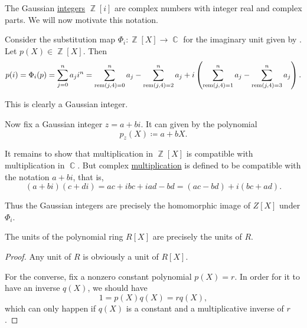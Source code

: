 \begin{example}\label{ex:polynomial_evaluation_gaussian_integers}
  The Gaussian \hyperref[def:gaussian_integers]{integers} \( \BbbZ[i] \) are complex numbers with integer real and complex parts. We will now motivate this notation.

  Consider the substitution map \( \Phi_i: \BbbZ[X] \to \BbbC \) for the imaginary unit given by . Let \( p(X) \in \BbbZ[X] \). Then
  \begin{equation*}
    p(i)
    =
    \Phi_i(p)
    =
    \sum_{j=0}^n a_j i^n
    =
    \sum_{\operatorname{rem}(j, 4) = 0}^n a_j - \sum_{\operatorname{rem}(j, 4) = 2}^n a_j + i \left(\sum_{\operatorname{rem}(j, 4) = 1}^n a_j - \sum_{\operatorname{rem}(j, 4) = 3}^n a_j \right).
  \end{equation*}

  This is clearly a Gaussian integer.

  Now fix a Gaussian integer \( z = a + bi \). It can given by the polynomial
  \begin{equation*}
    p_z(X) \coloneqq a + bX.
  \end{equation*}

  It remains to show that multiplication in \( \BbbZ[X] \) is compatible with multiplication in \( \BbbC \). But complex \hyperref[def:complex_numbers]{multiplication} is defined to be compatible with the notation \( a + bi \), that is,
  \begin{equation*}
    (a + bi) (c + di)
    =
    ac + ibc + iad - bd
    =
    (ac - bd) + i(bc + ad).
  \end{equation*}

  Thus the Gaussian integers are precisely the homomorphic image of \( Z[X] \) under \( \Phi_i \).
\end{example}

\begin{proposition}\label{thm:polynomial_ring_units}
  The units of the polynomial ring \( R[X] \) are precisely the units of \( R \).
\end{proposition}
\begin{proof}
  Any unit of \( R \) is obviously a unit of \( R[X] \).

  For the converse, fix a nonzero constant polynomial \( p(X) = r \). In order for it to have an inverse \( q(X) \), we should have
  \begin{equation*}
    1 = p(X) q(X) = r q(X),
  \end{equation*}
  which can only happen if \( q(X) \) is a constant and a multiplicative inverse of \( r \).
\end{proof}

